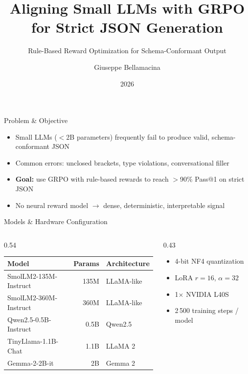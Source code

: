 \documentclass[10pt, aspectratio=169]{beamer}
\title{Aligning Small LLMs with GRPO\\[0.25em]for Strict JSON Generation}
\subtitle{Rule-Based Reward Optimization for Schema-Conformant Output}
\author{Giuseppe Bellamacina}
\date{2026}
\begin{document}
{
  \maketitle
}

\begin{frame}{Problem \& Objective}
  \begin{itemize}
    \setlength\itemsep{0.75em}
    \item Small LLMs ($<$2B parameters) frequently fail to produce valid,
          schema-conformant JSON
    \item Common errors: unclosed brackets, type violations, conversational filler
    \item \textbf{Goal:} use GRPO with rule-based rewards to reach
          $>$90\% Pass@1 on strict JSON
    \item No neural reward model $\rightarrow$
          dense, \alert{deterministic}, interpretable signal
  \end{itemize}
\end{frame}

\begin{frame}{Models \& Hardware Configuration}
  \begin{columns}[T]
    \begin{column}{0.54\textwidth}
      \renewcommand{\arraystretch}{1.35}
      \begin{tabular}{@{}lrl@{}}
        \toprule
        \textbf{Model}         & \textbf{Params} & \textbf{Architecture} \\
        \midrule
        SmolLM2-135M-Instruct  & 135M & LLaMA-like \\
        SmolLM2-360M-Instruct  & 360M & LLaMA-like \\
        Qwen2.5-0.5B-Instruct  & 0.5B & Qwen2.5 \\
        TinyLlama-1.1B-Chat    & 1.1B & LLaMA 2 \\
        Gemma-2-2B-it          &   2B & Gemma 2 \\
        \bottomrule
      \end{tabular}
    \end{column}
    \begin{column}{0.43\textwidth}
      \vspace{0.4em}
      \begin{itemize}
        \setlength\itemsep{0.6em}
        \item 4-bit NF4 quantization
        \item LoRA \quad $r{=}16$,\; $\alpha{=}32$
        \item 1$\times$ NVIDIA L40S
        \item 2\,500 training steps / model
      \end{itemize}
    \end{column}
  \end{columns}
\end{frame}
\end{document}
